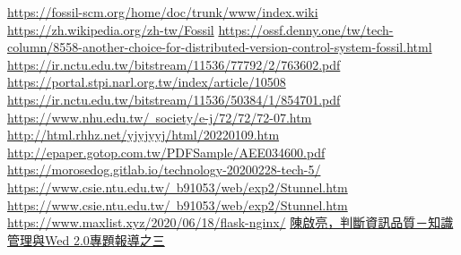 \renewcommand\bibname{參考文獻}
\begin{thebibliography}{99}
\href{https://fossil-scm.org/home/doc/trunk/www/index.wiki}{https://fossil-scm.org/home/doc/trunk/www/index.wiki}
\href{https://zh.wikipedia.org/zh-tw/Fossil}{https://zh.wikipedia.org/zh-tw/Fossil}
\href{https://ossf.denny.one/tw/tech-column/8558-another-choice-for-distributed-version-control-system-fossil.html}{https://ossf.denny.one/tw/tech-column/8558-another-choice-for-distributed-version-control-system-fossil.html}
\href{https://ir.nctu.edu.tw/bitstream/11536/77792/2/763602.pdf}{https://ir.nctu.edu.tw/bitstream/11536/77792/2/763602.pdf}
\href{https://portal.stpi.narl.org.tw/index/article/10508}{https://portal.stpi.narl.org.tw/index/article/10508}
\href{https://ir.nctu.edu.tw/bitstream/11536/50384/1/854701.pdf}{https://ir.nctu.edu.tw/bitstream/11536/50384/1/854701.pdf}
\href{https://www.nhu.edu.tw/~society/e-j/72/72/72-07.htm}{https://www.nhu.edu.tw/~society/e-j/72/72/72-07.htm}
\href{http://html.rhhz.net/yjyjyyj/html/20220109.htm}{http://html.rhhz.net/yjyjyyj/html/20220109.htm}
\href{http://epaper.gotop.com.tw/PDFSample/AEE034600.pdf}{http://epaper.gotop.com.tw/PDFSample/AEE034600.pdf}
\href{https://morosedog.gitlab.io/technology-20200228-tech-5/}{https://morosedog.gitlab.io/technology-20200228-tech-5/}
\href{https://www.csie.ntu.edu.tw/~b91053/web/exp2/Stunnel.htm}{https://www.csie.ntu.edu.tw/~b91053/web/exp2/Stunnel.htm}
\href{https://www.csie.ntu.edu.tw/~b91053/web/exp2/Stunnel.htm}{https://www.csie.ntu.edu.tw/~b91053/web/exp2/Stunnel.htm}
\href{https://www.maxlist.xyz/2020/06/18/flask-nginx/}{https://www.maxlist.xyz/2020/06/18/flask-nginx/}
\href{}{}
\href{}{}
\href{}{}
\href{}{}
\href{}{}
\href{}{}
\href{}{}
\href{陳啟亮，判斷資訊品質－知識管理與Wed 2.0專題報導之三}{陳啟亮，判斷資訊品質－知識管理與Wed 2.0專題報導之三}
\href{}{}
\href{}{}
\href{}{}
\href{}{}
\href{}{}
\href{}{}
\href{}{}
\href{}{}
\href{}{}

\end{thebibliography}
\par